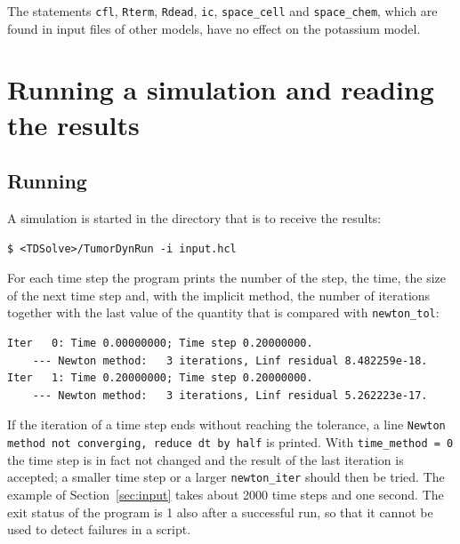 \documentclass[11pt]{article}
\newcommand{\code}[1]{\texttt{#1}}
\begin{document}
\begin{sloppypar}\noindent
The statements \code{cfl}, \code{Rterm}, \code{Rdead}, \code{ic}, \code{space\_cell} and \code{space\_chem}, which are found in input files of other models, have no effect on the potassium model.
\end{sloppypar}

\section{Running a simulation and reading the results}
\label{sec:run}

\subsection{Running}
A simulation is started in the directory that is to receive the results:
\begin{lstlisting}
$ <TDSolve>/TumorDynRun -i input.hcl
\end{lstlisting}
For each time step the program prints the number of the step, the time, the size of the next time step and, with the implicit method, the number of iterations together with the last value of the quantity that is compared with \code{newton\_tol}:
\begin{lstlisting}
Iter   0: Time 0.00000000; Time step 0.20000000.
    --- Newton method:   3 iterations, Linf residual 8.482259e-18.
Iter   1: Time 0.20000000; Time step 0.20000000.
    --- Newton method:   3 iterations, Linf residual 5.262223e-17.
\end{lstlisting}
If the iteration of a time step ends without reaching the tolerance, a line \code{Newton method not converging, reduce dt by half} is printed. With \code{time\_method = 0} the time step is in fact not changed and the result of the last iteration is accepted; a smaller time step or a larger \code{newton\_iter} should then be tried.
The example of Section~\ref{sec:input} takes about 2000 time steps and one second.
The exit status of the program is 1 also after a successful run, so that it cannot be used to detect failures in a script.
\end{document}
